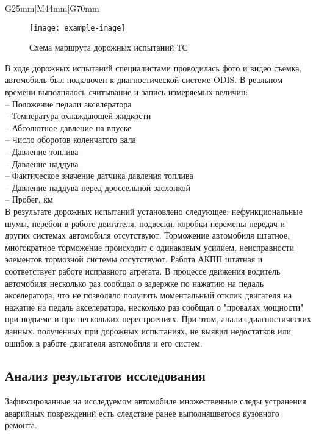 \begin{longtable}{G{25mm}|M{44mm}|G{70mm}}
 \begin{figure}[H]
 	\centering
 	\texttt{[image: example-image]}
 	\caption{Схема маршрута дорожных испытаний ТС  }
 	\label{shemam}
 \end{figure}
 В ходе дорожных испытаний специалистами  проводилась фото и видео съемка,  автомобиль был подключен к диагностической системе ODIS. В реальном времени выполнялось считывание и запись измеряемых величин:\\
 -- Положение педали акселератора\\
 -- Температура охлаждающей жидкости\\
 -- Абсолютное давление на впуске\\
 -- Число оборотов коленчатого вала\\
 -- Давление топлива\\
 -- Давление наддува\\
 -- Фактическое значение датчика давления топлива\\
 -- Давление наддува перед дроссельной заслонкой\\
 -- Пробег, км\\
  
 В результате дорожных испытаний установлено следующее: нефункциональные шумы, перебои в работе двигателя, подвески, коробки перемены передач и других системах автомобиля отсутствуют.   Торможение автомобиля штатное, многократное торможение происходит с одинаковым усилием, неисправности элементов тормозной системы отсутствуют. Работа АКПП штатная и соответствует работе исправного агрегата. В процессе движения водитель автомобиля несколько раз сообщал о задержке  по нажатию на педаль акселератора, что  не  позволяло получить моментальный отклик двигателя на нажатие на педаль акселератора, несколько раз сообщал о "провалах  мощности" при подъеме и при нескольких перестроениях. При этом, анализ диагностических данных, полученных при дорожных испытаниях, не выявил недостатков или ошибок в работе двигателя автомобиля и его систем.  \\
 

\subsection{Анализ результатов исследования}

   Зафиксированные на исследуемом автомобиле  множественные следы устранения аварийных повреждений есть следствие ранее выполняшвегося кузовного ремонта.\\  



\end{longtable}
